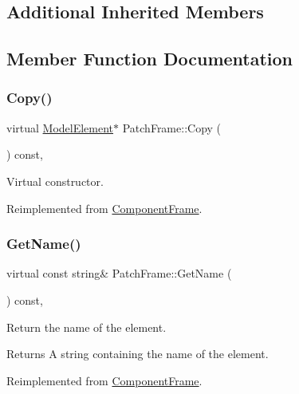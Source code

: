 \subsection*{Additional Inherited Members}


\subsection{Member Function Documentation}
\mbox{\label{classPatchFrame_a4103f544750beb79b95795c6be388c1d}} 
\subsubsection{\texorpdfstring{Copy()}{Copy()}}
{\footnotesize\ttfamily virtual \hyperlink{classModelElement}{Model\+Element}$\ast$ Patch\+Frame\+::\+Copy (\begin{DoxyParamCaption}{ }\end{DoxyParamCaption}) const\hspace{0.3cm}{\ttfamily [inline]}, {\ttfamily [virtual]}}

Virtual constructor. 

Reimplemented from \hyperlink{classComponentFrame_a24f6aea39b57e4b10a764877d1be6b7f}{Component\+Frame}.

\mbox{\label{classPatchFrame_a51ebb7649aa5fc1403bcd70925d7c85f}} 
\subsubsection{\texorpdfstring{Get\+Name()}{GetName()}}
{\footnotesize\ttfamily virtual const string\& Patch\+Frame\+::\+Get\+Name (\begin{DoxyParamCaption}{ }\end{DoxyParamCaption}) const\hspace{0.3cm}{\ttfamily [inline]}, {\ttfamily [virtual]}}

Return the name of the element. \begin{DoxyReturn}{Returns}
A string containing the name of the element. 
\end{DoxyReturn}


Reimplemented from \hyperlink{classComponentFrame_a32bc80a48e64f286ee07519e17220248}{Component\+Frame}.

